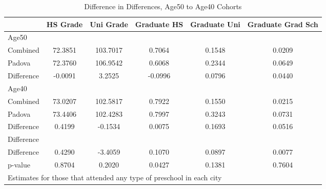 \begin{table}[htbp]\centering
\caption{Difference in Differences, Age50 to Age40 Cohorts}
\begin{tabular}{l*{5}{c}}
\hline\hline
            &    HS Grade&   Uni Grade& Graduate HS&Graduate Uni&Graduate Grad Sch\\
\hline
Age50       &            &            &            &            &            \\
Combined    &     72.3851&    103.7017&      0.7064&      0.1548&      0.0209\\
Padova      &     72.3760&    106.9542&      0.6068&      0.2344&      0.0649\\
Difference  &     -0.0091&      3.2525&     -0.0996&      0.0796&      0.0440\\
\hline
Age40       &            &            &            &            &            \\
Combined    &     73.0207&    102.5817&      0.7922&      0.1550&      0.0215\\
Padova      &     73.4406&    102.4283&      0.7997&      0.3243&      0.0731\\
Difference  &      0.4199&     -0.1534&      0.0075&      0.1693&      0.0516\\
\hline
Difference  &            &            &            &            &            \\
Difference  &      0.4290&     -3.4059&      0.1070&      0.0897&      0.0077\\
p-value     &      0.8704&      0.2020&      0.0427&      0.1381&      0.7604\\
\hline\hline
\multicolumn{6}{l}{\footnotesize Estimates for those that attended any type of preschool in each city}\\
\end{tabular}
\end{table}
